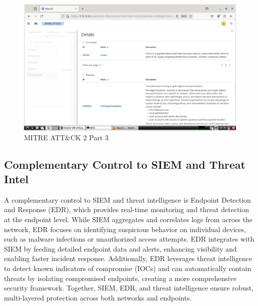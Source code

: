 \documentclass[12pt,a4paper]{report}
\begin{document}
\begin{figure}[H]
\centering
\includegraphics[width=\textwidth]{ATTK 2 PIC 03.png}
\caption{MITRE ATT\&CK 2 Part 3}
\end{figure}

\subsection{Complementary Control to SIEM and Threat Intel}
A complementary control to SIEM and threat intelligence is Endpoint Detection and Response (EDR), which provides real-time monitoring and threat detection at the endpoint level. While SIEM aggregates and correlates logs from across the network, EDR focuses on identifying suspicious behavior on individual devices, such as malware infections or unauthorized access attempts. EDR integrates with SIEM by feeding detailed endpoint data and alerts, enhancing visibility and enabling faster incident response. Additionally, EDR leverages threat intelligence to detect known indicators of compromise (IOCs) and can automatically contain threats by isolating compromised endpoints, creating a more comprehensive security framework. Together, SIEM, EDR, and threat intelligence ensure robust, multi-layered protection across both networks and endpoints.
\end{document}
